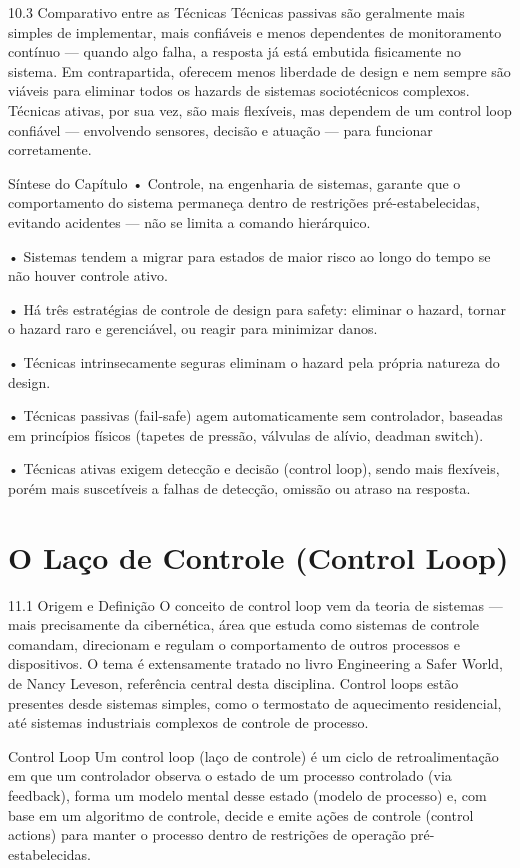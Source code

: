 10.3 Comparativo entre as Técnicas Técnicas passivas são geralmente mais simples de implementar, mais confiáveis e menos dependentes de monitoramento contínuo — quando algo falha, a resposta já está embutida fisicamente no sistema. Em contrapartida, oferecem menos liberdade de design e nem sempre são viáveis para eliminar todos os hazards de sistemas sociotécnicos complexos. Técnicas ativas, por sua vez, são mais flexíveis, mas dependem de um control loop confiável — envolvendo sensores, decisão e atuação — para funcionar corretamente.

Síntese do Capítulo • Controle, na engenharia de sistemas, garante que o comportamento do sistema permaneça dentro de restrições pré-estabelecidas, evitando acidentes — não se limita a comando hierárquico.

• Sistemas tendem a migrar para estados de maior risco ao longo do tempo se não houver controle ativo.

• Há três estratégias de controle de design para safety: eliminar o hazard, tornar o hazard raro e gerenciável, ou reagir para minimizar danos.

• Técnicas intrinsecamente seguras eliminam o hazard pela própria natureza do design.

• Técnicas passivas (fail-safe) agem automaticamente sem controlador, baseadas em princípios físicos (tapetes de pressão, válvulas de alívio, deadman switch).

• Técnicas ativas exigem detecção e decisão (control loop), sendo mais flexíveis, porém mais suscetíveis a falhas de detecção, omissão ou atraso na resposta.

\chapter{O Laço de Controle (Control Loop)}

11.1 Origem e Definição O conceito de control loop vem da teoria de sistemas — mais precisamente da cibernética, área que estuda como sistemas de controle comandam, direcionam e regulam o comportamento de outros processos e dispositivos. O tema é extensamente tratado no livro Engineering a Safer World, de Nancy Leveson, referência central desta disciplina. Control loops estão presentes desde sistemas simples, como o termostato de aquecimento residencial, até sistemas industriais complexos de controle de processo.

Control Loop Um control loop (laço de controle) é um ciclo de retroalimentação em que um controlador observa o estado de um processo controlado (via feedback), forma um modelo mental desse estado (modelo de processo) e, com base em um algoritmo de controle, decide e emite ações de controle (control actions) para manter o processo dentro de restrições de operação pré-estabelecidas.

